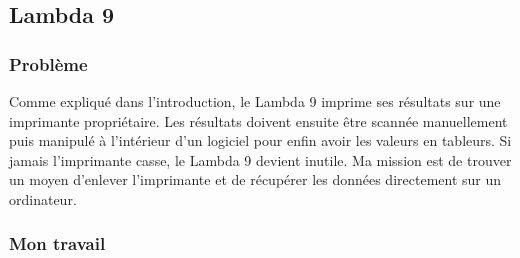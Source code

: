 \documentclass[12pt]{article}
\begin{document}
\newpage
\subsection{ Lambda 9 }

\subsubsection{ Problème }


Comme expliqué dans l'introduction, le Lambda 9 imprime ses résultats sur une imprimante propriétaire.
Les résultats doivent ensuite être scannée manuellement puis manipulé à l'intérieur d'un logiciel pour enfin avoir les valeurs en tableurs.
Si jamais l'imprimante casse, le Lambda 9 devient inutile.
Ma mission est de trouver un moyen d'enlever l'imprimante et de récupérer les données directement sur un ordinateur.

\subsubsection{ Mon travail }
\end{document}
